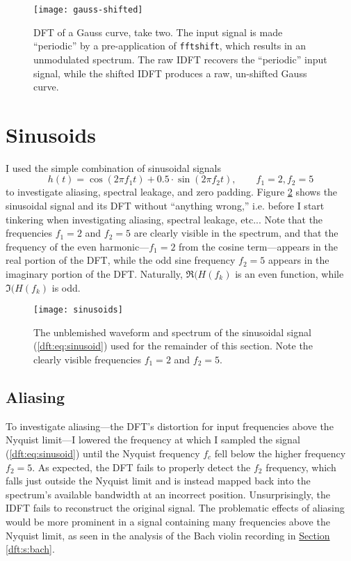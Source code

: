 \documentclass[11pt, a4paper]{article}
\begin{document}
\begin{figure}
\centering
\texttt{[image: gauss-shifted]}
\caption{DFT of a Gauss curve, take two. The input signal is made ``periodic'' by a pre-application of \texttt{fftshift}, which results in an unmodulated spectrum. The raw IDFT recovers the ``periodic'' input signal, while the shifted IDFT produces a raw, un-shifted Gauss curve.}
\label{dft:fig:gauss-shifted}
\end{figure}


\section{Sinusoids}
I used the simple combination of sinusoidal signals
\begin{equation}
	h(t) = \cos(2\pi f_{1} t) + 0.5 \cdot \sin(2\pi f_{2}t), \qquad f_{1} = 2, f_{2} = 5 \label{dft:eq:sinusoid}
\end{equation}
to investigate aliasing, spectral leakage, and zero padding. Figure \ref{dft:fig:sinusoids} shows the sinusoidal signal and its DFT without ``anything wrong,'' i.e. before I start tinkering when investigating aliasing, spectral leakage, etc... Note that the frequencies $ f_{1} = 2 $ and $ f_{2} = 5 $ are clearly visible in the spectrum, and that the frequency of the even harmonic---$ f_{1} = 2 $ from the cosine term---appears in the real portion of the DFT, while the odd sine frequency $ f_{2} = 5 $ appears in the imaginary portion of the DFT. Naturally, $ \Re(H(f_{k}) $ is an even function, while $ \Im(H(f_{k})  $ is odd. 


\begin{figure}[htb!]
\centering
\texttt{[image: sinusoids]}
\vspace{-6mm}
\caption{The unblemished waveform and spectrum of the sinusoidal signal (\ref{dft:eq:sinusoid}) used for the remainder of this section. Note the clearly visible frequencies $ f_{1} = 2 $ and $ f_{2} = 5 $.}
\label{dft:fig:sinusoids}
\end{figure}

\subsection{Aliasing}
To investigate aliasing---the DFT's distortion for input frequencies above the Nyquist limit---I lowered the frequency at which I sampled the signal (\ref{dft:eq:sinusoid}) until the Nyquist frequency $ f_{c} $ fell below the higher frequency $ f_{2} = 5 $. As expected, the DFT fails to properly detect the $ f_{2} $ frequency, which falls just outside the Nyquist limit and is instead mapped back into the spectrum's available bandwidth at an incorrect position. Unsurprisingly, the IDFT fails to reconstruct the original signal. The problematic effects of aliasing would be more prominent in a signal containing many frequencies above the Nyquist limit, as seen in the analysis of the Bach violin recording in  \hyperref[dft:s:bach]{Section \ref{dft:s:bach}}.
\end{document}
